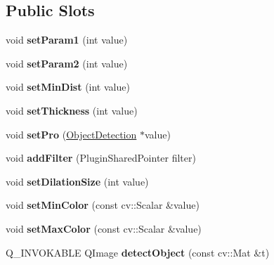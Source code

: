 \subsection*{Public Slots}
\begin{DoxyCompactItemize}
\item 
\mbox{\label{class_color_detector_controller_a12cef009b075aee19592b6f9d5bf4d08}} 
void {\bfseries set\+Param1} (int value)
\item 
\mbox{\label{class_color_detector_controller_a3a383fee14bb11464f077843fbef6ef3}} 
void {\bfseries set\+Param2} (int value)
\item 
\mbox{\label{class_color_detector_controller_aa2d6bc51226ab600bd98a272f4578eea}} 
void {\bfseries set\+Min\+Dist} (int value)
\item 
\mbox{\label{class_color_detector_controller_a9e740e8277b4a20331073f06dc21c2b3}} 
void {\bfseries set\+Thickness} (int value)
\item 
\mbox{\label{class_color_detector_controller_a2b54a80644a924cbe41c105fc26ecf6f}} 
void {\bfseries set\+Pro} (\hyperlink{class_image_processor_1_1_object_detection}{Object\+Detection} $\ast$value)
\item 
\mbox{\label{class_color_detector_controller_a0f8f5e688e6b6cc636fd9b7b1dd90a0a}} 
void {\bfseries add\+Filter} (Plugin\+Shared\+Pointer filter)
\item 
\mbox{\label{class_color_detector_controller_acf885c6d9cc0c81601143d678bb9f890}} 
void {\bfseries set\+Dilation\+Size} (int value)
\item 
\mbox{\label{class_color_detector_controller_a7bcd481a9b607e2078a68d51158868a7}} 
void {\bfseries set\+Min\+Color} (const cv\+::\+Scalar \&value)
\item 
\mbox{\label{class_color_detector_controller_ac143c0f40e57336aac8a05f6d6148d12}} 
void {\bfseries set\+Max\+Color} (const cv\+::\+Scalar \&value)
\item 
\mbox{\label{class_color_detector_controller_afbf3737d1542b0e1517621b90b7efe15}} 
Q\+\_\+\+I\+N\+V\+O\+K\+A\+B\+LE Q\+Image {\bfseries detect\+Object} (const cv\+::\+Mat \&t)
\end{DoxyCompactItemize}
